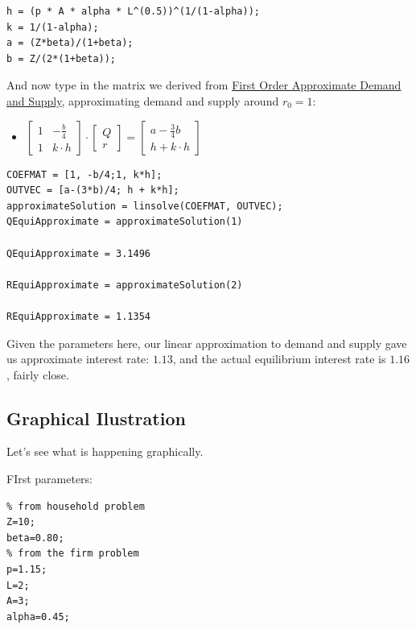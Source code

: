 \documentclass[
]{book}
\providecommand{\tightlist}{%
  \setlength{\itemsep}{0pt}\setlength{\parskip}{0pt}}
\begin{document}
\begin{verbatim}
h = (p * A * alpha * L^(0.5))^(1/(1-alpha));
k = 1/(1-alpha);
a = (Z*beta)/(1+beta);
b = Z/(2*(1+beta));
\end{verbatim}

And now type in the matrix we derived from \href{https://math4econ.github.io/matrix_application/demand_supply_taylor_approximate.html}{First Order Approximate
Demand and
Supply},
approximating demand and supply around \(r_0 =1\):

\begin{itemize}
\tightlist
\item
  \(\displaystyle \left\lbrack \begin{array}{cc} 1 & -\frac{b}{4}\\ 1 & k\cdot h \end{array}\right\rbrack \cdot \left\lbrack \begin{array}{c} Q\\ r \end{array}\right\rbrack =\left\lbrack \begin{array}{c} a-\frac{3}{4}b\\ h+k\cdot h \end{array}\right\rbrack\)
\end{itemize}

\begin{verbatim}
COEFMAT = [1, -b/4;1, k*h];
OUTVEC = [a-(3*b)/4; h + k*h];
approximateSolution = linsolve(COEFMAT, OUTVEC);
QEquiApproximate = approximateSolution(1)

QEquiApproximate = 3.1496

REquiApproximate = approximateSolution(2)

REquiApproximate = 1.1354
\end{verbatim}

Given the parameters here, our linear approximation to demand and supply
gave us approximate interest rate: \(1.13\), and the actual equilibrium
interest rate is \(1.16\), fairly close.

\hypertarget{graphical-ilustration}{%
\subsection{Graphical Ilustration}\label{graphical-ilustration}}

Let's see what is happening graphically.

FIrst parameters:

\begin{verbatim}
% from household problem
Z=10;
beta=0.80;
% from the firm problem
p=1.15;
L=2; 
A=3; 
alpha=0.45;
\end{verbatim}
\end{document}
